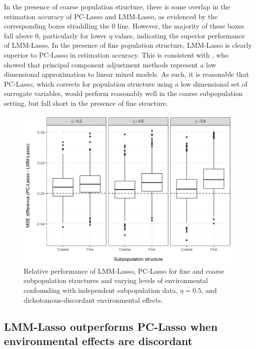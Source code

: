 In the presence of coarse population structure, there is some overlap in the estimation accuracy of PC-Lasso and LMM-Lasso, as evidenced by the corresponding boxes straddling the 0 line. However, the majority of these boxes fall above 0, particularly for lower $\eta$ values, indicating the superior performance of LMM-Lasso. In the presence of fine population structure, LMM-Lasso is clearly superior to PC-Lasso in estimation accuracy. This is consistent with \citep{hoffman2013correcting}, who showed that principal component adjustment methods represent a low dimensional approximation to linear mixed models. As such, it is reasonable that PC-Lasso, which corrects for population structure using a low dimensional set of surrogate variables, would perform reasonably well in the coarse subpopulation setting, but fall short in the presence of fine structure. 
\begin{figure}[H]
    \centering
     \includegraphics[scale = 0.9]{figures/mse_diff_subpops.png}
    \caption{Relative performance of LMM-Lasso, PC-Lasso for fine and coarse subpopulation structures and varying levels of environmental confounding with independent subpopulation data, $\eta = 0.5$, and dichotomous-discordant environmental effects.}
    \label{fig:big_vs_small}
\end{figure}


\subsection{LMM-Lasso outperforms PC-Lasso when environmental effects are discordant}

